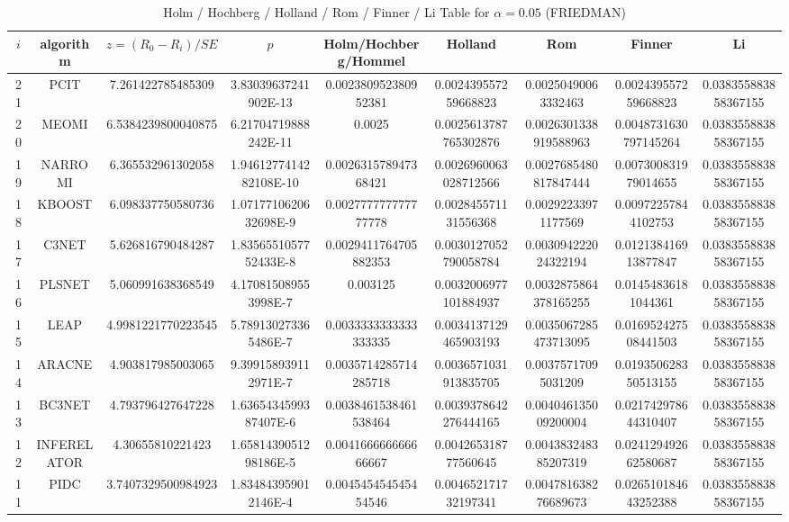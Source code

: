 \documentclass[a4paper,10pt]{article}
\begin{document}
\begin{landscape}
\begin{table}[!htp]
\begin{tabular}{
|r|r|r|r|r|r|r|r|r|r|r|r|r|r|r|r|r|r|r|r|r|r|r|}
\end{tabular}
\end{table}

\newpage

\begin{table}[!htp]
\centering\scriptsize
\caption{Holm / Hochberg / Holland / Rom / Finner / Li Table for $\alpha=0.05$ (FRIEDMAN)}
\begin{tabular}{ccccccccc}
$i$&algorithm&$z=(R_0 - R_i)/SE$&$p$&Holm/Hochberg/Hommel&Holland&Rom&Finner&Li\\
\hline
21&PCIT&7.261422785485309&3.83039637241902E-13&0.002380952380952381&0.002439557259668823&0.00250490063332463&0.002439557259668823&0.038355883858367155\\
20&MEOMI&6.5384239800040875&6.21704719888242E-11&0.0025&0.0025613787765302876&0.0026301338919588963&0.0048731630797145264&0.038355883858367155\\
19&NARROMI&6.365532961302058&1.9461277414282108E-10&0.002631578947368421&0.0026960063028712566&0.0027685480817847444&0.007300831979014655&0.038355883858367155\\
18&KBOOST&6.098337750580736&1.0717710620632698E-9&0.002777777777777778&0.002845571131556368&0.00292233971177569&0.00972257844102753&0.038355883858367155\\
17&C3NET&5.626816790484287&1.8356551057752433E-8&0.0029411764705882353&0.0030127052790058784&0.003094222024322194&0.012138416913877847&0.038355883858367155\\
16&PLSNET&5.060991638368549&4.170815089553998E-7&0.003125&0.0032006977101884937&0.0032875864378165255&0.01454836181044361&0.038355883858367155\\
15&LEAP&4.9981221770223545&5.789130273365486E-7&0.0033333333333333335&0.0034137129465903193&0.0035067285473713095&0.016952427508441503&0.038355883858367155\\
14&ARACNE&4.903817985003065&9.399158939112971E-7&0.0035714285714285718&0.0036571031913835705&0.00375717095031209&0.019350628350513155&0.038355883858367155\\
13&BC3NET&4.793796427647228&1.6365434599387407E-6&0.0038461538461538464&0.0039378642276444165&0.004046135009200004&0.021742978644310407&0.038355883858367155\\
12&INFERELATOR&4.30655810221423&1.6581439051298186E-5&0.004166666666666667&0.004265318777560645&0.004383248385207319&0.024129492662580687&0.038355883858367155\\
11&PIDC&3.7407329500984923&1.834843959012146E-4&0.004545454545454546&0.004652171732197341&0.004781638276689673&0.026510184643252388&0.038355883858367155\\

\end{tabular}
\end{table}
\end{landscape}
\end{document}
